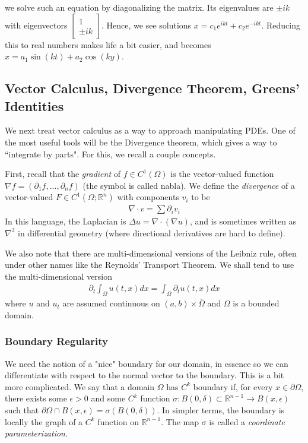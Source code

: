 \documentclass{article}
\newcommand{\R}{{\mathbb{R}}}
\newcommand{\cl}[1]{{\overline{#1}}}
\newcommand{\pd}{\partial}
\begin{document}
	we solve such an equation by diagonalizing the matrix. Its eigenvalues are $\pm i k$ with eigenvectors $\begin{bmatrix} 1 \\ \pm ik\end{bmatrix}$. Hence, we see solutions $x = c_{1}e^{ik t} + c_{2}e^{-ik t}$. Reducing this to real numbers makes life a bit easier, and becomes $x = a_1 \sin(kt) + a_{2} \cos(ky)$.
	
	\subsection{Vector Calculus, Divergence Theorem, Greens' Identities}
	
	We next treat vector calculus as a way to approach manipulating PDEs. One of the most useful tools will be the Divergence theorem, which gives a way to ``integrate by parts". For this, we recall a couple concepts. 
	
	First, recall that the \textit{gradient} of $f \in C^{1}(\Omega)$ is the vector-valued function $\nabla f = (\pd_{1}f,...,\pd_{n}f)$ (the symbol is called nabla). We define the \textit{divergence} of a vector-valued $F \in C^{1}(\Omega;\R^{n})$ with components $v_i$ to be 
	\begin{align*}
		\nabla \cdot v = \sum \pd_{i}v_i
	\end{align*}
	In this language, the Laplacian is $\Delta u = \nabla \cdot (\nabla u)$, and is sometimes written as $\nabla^{2}$ in differential geometry (where directional derivatives are hard to define).
	
	
	We also note that there are multi-dimensional versions of the Leibniz rule, often under other names like the Reynolds' Transport Theorem. We shall tend to use the multi-dimensional version 
	\begin{align*}
		\pd_{t} \int_{\Omega} u(t,x) dx = \int_{\Omega} \pd_{t}u(t,x) dx
	\end{align*}
	where $u$ and $u_t$ are assumed continuous on $(a,b) \times \cl{\Omega}$ and $\Omega$ is a bounded domain. 
	
	
	\subsubsection{Boundary Regularity}
	
	We need the notion of a "nice" boundary for our domain, in essence so we can differentiate with respect to the normal vector to the boundary. This is a bit more complicated. We say that a domain $\Omega$ has $C^{k}$ boundary if, for every $x \in \pd \Omega$, there exists some $\epsilon > 0$ and some $C^{k}$ function $\sigma: B(0,\delta) \subset \R^{n-1} \to B(x,\epsilon)$ such that $\pd \Omega \cap B(x,\epsilon) = \sigma( B(0,\delta))$. In simpler terms, the boundary is locally the graph of a $C^{k}$ function on $\R^{n-1}$. The map $\sigma$ is called a \textit{coordinate parameterization}. 
	
\end{document}
